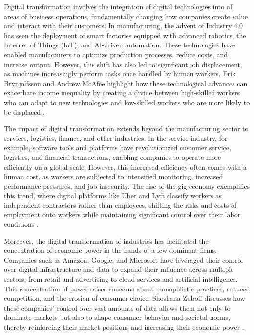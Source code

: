 \begin{refsection}
Digital transformation involves the integration of digital technologies into all areas of business operations, fundamentally changing how companies create value and interact with their customers. In manufacturing, the advent of Industry 4.0 has seen the deployment of smart factories equipped with advanced robotics, the Internet of Things (IoT), and AI-driven automation. These technologies have enabled manufacturers to optimize production processes, reduce costs, and increase output. However, this shift has also led to significant job displacement, as machines increasingly perform tasks once handled by human workers. Erik Brynjolfsson and Andrew McAfee highlight how these technological advances can exacerbate income inequality by creating a divide between high-skilled workers who can adapt to new technologies and low-skilled workers who are more likely to be displaced \cite[pp.~148-151]{brynjolfsson2017second}.

The impact of digital transformation extends beyond the manufacturing sector to services, logistics, finance, and other industries. In the service industry, for example, software tools and platforms have revolutionized customer service, logistics, and financial transactions, enabling companies to operate more efficiently on a global scale. However, this increased efficiency often comes with a human cost, as workers are subjected to intensified monitoring, increased performance pressures, and job insecurity. The rise of the gig economy exemplifies this trend, where digital platforms like Uber and Lyft classify workers as independent contractors rather than employees, shifting the risks and costs of employment onto workers while maintaining significant control over their labor conditions \cite[pp.~31-33]{srnicek2017platform}.

Moreover, the digital transformation of industries has facilitated the concentration of economic power in the hands of a few dominant firms. Companies such as Amazon, Google, and Microsoft have leveraged their control over digital infrastructure and data to expand their influence across multiple sectors, from retail and advertising to cloud services and artificial intelligence. This concentration of power raises concerns about monopolistic practices, reduced competition, and the erosion of consumer choice. Shoshana Zuboff discusses how these companies' control over vast amounts of data allows them not only to dominate markets but also to shape consumer behavior and societal norms, thereby reinforcing their market positions and increasing their economic power \cite[pp.~216-219]{zuboff2020age}.


\end{refsection}
